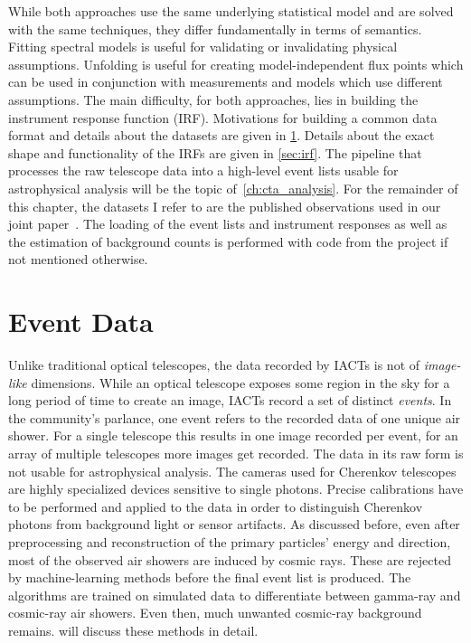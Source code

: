 While both approaches use the same underlying statistical model and are solved with the same techniques, they differ 
fundamentally in terms of semantics. Fitting spectral models is useful for validating or invalidating physical assumptions. 
Unfolding is useful for creating model-independent flux points which can be used in conjunction with measurements and models 
which use different assumptions. 
The main difficulty, for both approaches, lies in building the instrument response function (IRF). 
Motivations for building a common data format and details about the datasets are given in \cref{sec:open-data}. 
Details about the exact shape and functionality of the IRFs are given in \cref{sec:irf}.
The pipeline that processes the raw telescope data into a high-level event lists usable for astrophysical analysis 
will be the topic of~\cref{ch:cta_analysis}.
For the remainder of this chapter, the datasets I refer to are the published observations 
used in our joint paper~\cite{joint_crab}. 
The loading of the event lists and instrument responses as well as the estimation of background counts is performed with code from the \gammapy project 
if not mentioned otherwise. 

\section{Event Data}
\label{sec:open-data}
Unlike traditional optical telescopes, the data recorded by IACTs is not of \emph{image-like} dimensions. 
While an optical telescope exposes some region in the sky for a long period of time to create an image, IACTs record a set of distinct \emph{events}.
In the community's parlance, one event refers to the recorded data of one unique air shower. For a single telescope this results in one image recorded per event,
for an array of multiple telescopes more images get recorded. 
The data in its raw form is not usable for astrophysical analysis. 
The cameras used for Cherenkov telescopes are highly specialized devices sensitive to single photons. Precise calibrations have to be performed 
and applied to the data in order to distinguish Cherenkov photons from background light or sensor artifacts. 
As discussed before, even after preprocessing and reconstruction of the primary particles' energy and direction, most 
of the observed air showers are induced by cosmic rays.
These are rejected by machine-learning methods before the final event list is produced. The algorithms are trained on simulated data to differentiate between 
gamma-ray and cosmic-ray air showers. 
Even then, much unwanted cosmic-ray background remains. 
 will discuss these methods in detail.

